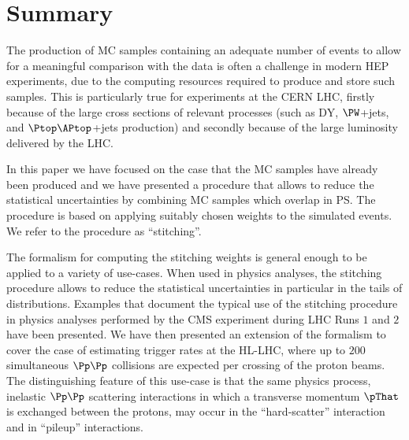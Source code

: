 \section{Summary}
\label{sec:summary}

The production of MC samples containing an adequate number of events to allow for a meaningful comparison with the data is often a challenge in modern HEP experiments,
due to the computing resources required to produce and store such samples.
This is particularly true for experiments at the CERN LHC,
firstly because of the large cross sections of relevant processes (such as DY, $\PW$+jets, and $\Ptop\APtop$+jets production)
and secondly because of the large luminosity delivered by the LHC.

In this paper we have focused on the case that the MC samples have already been produced
and we have presented a procedure that allows to reduce the statistical uncertainties 
by combining MC samples which overlap in PS.
The procedure is based on applying suitably chosen weights to the simulated events.
We refer to the procedure as ``stitching''.

The formalism for computing the stitching weights is general enough to be applied to a variety of use-cases.
When used in physics analyses, the stitching procedure allows to reduce the statistical uncertainties in particular in the tails of distributions.
Examples that document the typical use of the stitching procedure in physics analyses performed by the CMS experiment during LHC Runs $1$ and $2$ have been presented.
We have then presented an extension of the formalism to cover the case of estimating trigger rates at the HL-LHC,
where up to $200$ simultaneous $\Pp\Pp$ collisions are expected per crossing of the proton beams.
The distinguishing feature of this use-case is that the same physics process, 
inelastic $\Pp\Pp$ scattering interactions in which a transverse momentum $\pThat$ is exchanged between the protons,
may occur in the ``hard-scatter'' interaction and in ``pileup'' interactions.

